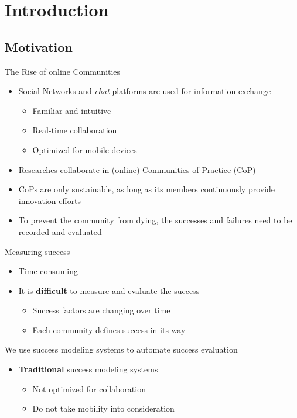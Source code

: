 \section{Introduction}

\subsection{Motivation}


\begin{frame}{The Rise of online Communities}
  \begin{itemize}
    \item  Social Networks and \emph{chat} platforms are used for information exchange
    \begin{itemize}
      \item Familiar and intuitive
      \item Real-time collaboration
      \item Optimized for mobile devices
    \end{itemize}
    \item Researches collaborate in (online) Communities of Practice (CoP)
    \item CoPs are only sustainable, as long as its members continuously provide innovation efforts \cite{RKJa15}
    \item To prevent the community from dying, the successes and failures need to be recorded and evaluated
  \end{itemize}

\end{frame}


\begin{frame}{Measuring success}
  \begin{itemize}
    \item Time consuming
    \item It is \textbf{difficult} to measure and evaluate the success
          \begin{itemize}
            \item Success factors are changing over time \cite{Renz08}
            \item Each community defines success in its way
          \end{itemize}
  \end{itemize}
 We use success modeling systems to automate success evaluation
    \begin{itemize}
        \item \textbf{Traditional} success modeling systems 
          \begin{itemize}
            \item Not optimized for collaboration
            \item Do not take mobility into consideration \cite{Renz08}
          \end{itemize}
  \end{itemize}
\end{frame}

